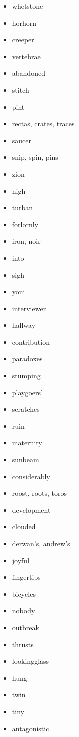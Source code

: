 \documentclass{article}
\begin{document}
\begin{itemize}
    \item whetstone
    \item horhorn
    \item creeper
    \item vertebrae
    \item abandoned
    \item stitch
    \item pint
    \item rectas, crates, traces
    \item saucer
    \item snip, spin, pins
    \item zion
    \item nigh
    \item turban
    \item forlornly
    \item iron, noir
    \item into
    \item sigh
    \item yoni
    \item interviewer
    \item hallway
    \item contribution
    \item paradoxes
    \item stumping
    \item playgoers'
    \item scratches
    \item ruin
    \item maternity
    \item sunbeam
    \item considerably
    \item roost, roots, toros
    \item development
    \item clouded
    \item derwan's, andrew's
    \item joyful
    \item fingertips
    \item bicycles
    \item nobody
    \item outbreak
    \item thrusts
    \item lookingglass
    \item hung
    \item twin
    \item tiny
    \item antagonistic

\end{itemize}
\end{document}
